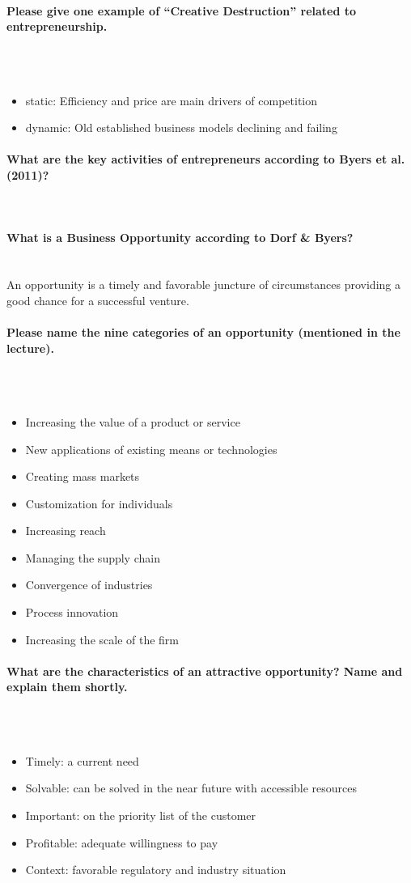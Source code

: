 \documentclass[10pt,a4paper,noendnumber=true]{scrartcl}
\newcommand{\properparagraph}[1]{\paragraph{\textcolor{Emerald}{#1}}\mbox{}\\}
\begin{document}
\properparagraph{Please give one example of “Creative Destruction” related to entrepreneurship.}
\\[-6ex]
\begin{itemize}
	\item static: Efficiency and price are main drivers of competition
	\item dynamic: Old established business models declining and failing	
\end{itemize}

\properparagraph{What are the key activities of entrepreneurs according to Byers et al. (2011)?}

\properparagraph{What is a Business Opportunity according to Dorf \& Byers?}
An opportunity is a timely and favorable juncture of circumstances providing a good chance for a successful venture.

\properparagraph{Please name the nine categories of an opportunity (mentioned in the lecture).}
\\[-6ex]
\begin{itemize}
	\item Increasing the value of a product or service
	\item New applications of existing means or technologies
	\item Creating mass markets
	\item Customization for individuals
	\item Increasing reach
	\item Managing the supply chain
	\item Convergence of industries
	\item Process innovation
	\item Increasing the scale of the firm
\end{itemize}

\properparagraph{What are the characteristics of an attractive opportunity? Name and explain them shortly.}
\\[-6ex]
\begin{itemize}
	\item Timely: a current need
	\item Solvable: can be solved in the near future with accessible resources
	\item Important: on the priority list of the customer
	\item Profitable: adequate willingness to pay
	\item Context: favorable regulatory and industry situation
\end{itemize}
\end{document}
